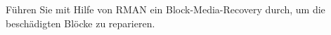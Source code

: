    \item F\"uhren Sie mit Hilfe von RMAN ein Block-Media-Recovery durch, um die be\-sch\"a\-dig\-ten Bl\"ocke zu reparieren.
